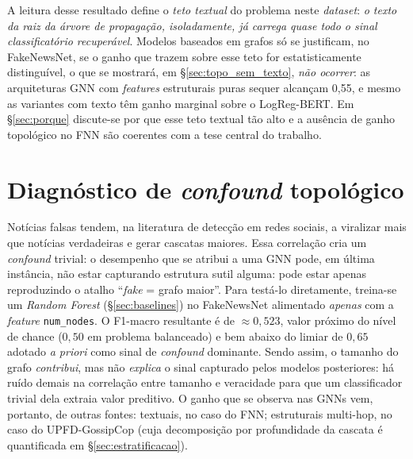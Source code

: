 A leitura desse resultado define o \emph{teto textual} do problema neste
\emph{dataset}: \emph{o texto da raiz da \'arvore de propaga\c{c}\~ao,
isoladamente, j\'a carrega quase todo o sinal classificat\'orio
recuper\'avel}. Modelos baseados em grafos s\'o se justificam, no
FakeNewsNet, se o ganho que trazem sobre esse teto for estatisticamente
distingu\'ivel, o que se mostrar\'a, em \S\ref{sec:topo_sem_texto},
\emph{n\~ao ocorrer}: as arquiteturas GNN com \emph{features} estruturais
puras sequer alcan\c{c}am 0,55, e mesmo as variantes com texto t\^em
ganho marginal sobre o LogReg-BERT. Em \S\ref{sec:porque} discute-se
por que esse teto textual t\~ao alto e a aus\^encia de ganho topol\'ogico
no FNN s\~ao coerentes com a tese central do trabalho.

\section{Diagn\'ostico de \emph{confound} topol\'ogico}
\label{sec:confound}

Not\'icias falsas tendem, na literatura de detec\c{c}\~ao em redes
sociais, a viralizar mais que not\'icias verdadeiras e gerar cascatas
maiores. Essa correla\c{c}\~ao cria um \emph{confound} trivial: o
desempenho que se atribui a uma GNN pode, em \'ultima inst\^ancia, n\~ao
estar capturando estrutura sutil alguma: pode estar apenas reproduzindo
o atalho ``\emph{fake} = grafo maior''. Para test\'a-lo diretamente,
treina-se um \emph{Random Forest} (\S\ref{sec:baselines}) no FakeNewsNet
alimentado \emph{apenas} com a \emph{feature} \texttt{num\_nodes}. O
F1-macro resultante \'e de $\approx 0{,}523$, valor pr\'oximo do
n\'ivel de chance ($0{,}50$ em problema balanceado) e bem abaixo do
limiar de $0{,}65$ adotado \emph{a priori} como sinal de
\emph{confound} dominante. Sendo assim, o tamanho do grafo \emph{contribui}, mas
n\~ao \emph{explica} o sinal capturado pelos modelos posteriores: h\'a
ru\'ido demais na correla\c{c}\~ao entre tamanho e veracidade para que um
classificador trivial dela extraia valor preditivo. O ganho que se
observa nas GNNs vem, portanto, de outras fontes: textuais, no caso do
FNN; estruturais multi-hop, no caso do UPFD-GossipCop (cuja
decomposi\c{c}\~ao por profundidade da cascata \'e quantificada em
\S\ref{sec:estratificacao}).

